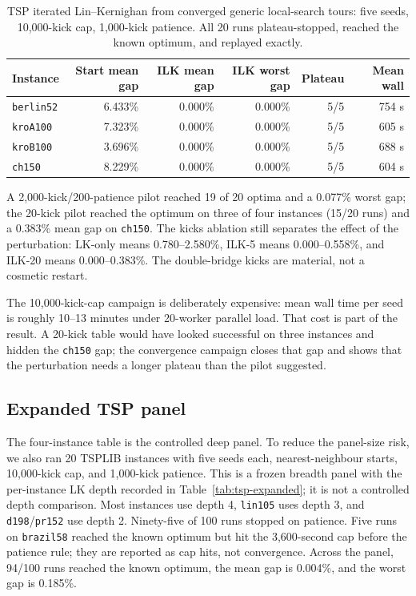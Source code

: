 \documentclass[11pt]{article}
\begin{document}
\begin{table}[t]
\centering
\caption{TSP iterated Lin--Kernighan from converged generic local-search tours: five seeds, 10,000-kick cap,
1,000-kick patience. All 20 runs plateau-stopped, reached the known optimum, and replayed exactly.}
\label{tab:tsp-ilk}
\small
\begin{tabular}{lrrrrr}
\toprule
Instance & Start mean gap & ILK mean gap & ILK worst gap & Plateau & Mean wall \\
\midrule
\texttt{berlin52} & 6.433\% & 0.000\% & 0.000\% & 5/5 & 754 s \\
\texttt{kroA100} & 7.323\% & 0.000\% & 0.000\% & 5/5 & 605 s \\
\texttt{kroB100} & 3.696\% & 0.000\% & 0.000\% & 5/5 & 688 s \\
\texttt{ch150} & 8.229\% & 0.000\% & 0.000\% & 5/5 & 604 s \\
\bottomrule
\end{tabular}
\end{table}

A 2,000-kick/200-patience pilot reached 19 of 20 optima and a 0.077\% worst gap; the 20-kick pilot
reached the optimum on three of four instances (15/20 runs) and a 0.383\% mean gap on \texttt{ch150}. The kicks ablation still separates the
effect of the perturbation: LK-only means 0.780--2.580\%, ILK-5 means 0.000--0.558\%, and ILK-20 means
0.000--0.383\%. The double-bridge kicks are material, not a cosmetic restart.

The 10,000-kick-cap campaign is deliberately expensive: mean wall time per seed is roughly 10--13 minutes
under 20-worker parallel load. That cost is part of the result. A 20-kick table would have looked
successful on three instances and hidden the \texttt{ch150} gap; the convergence campaign closes that
gap and shows that the perturbation needs a longer plateau than the pilot suggested.

\subsection{Expanded TSP panel}

The four-instance table is the controlled deep panel. To reduce the panel-size risk, we also ran 20
TSPLIB instances with five seeds each, nearest-neighbour starts, 10,000-kick cap, and 1,000-kick
patience. This is a frozen breadth panel with the per-instance LK depth recorded in Table~\ref{tab:tsp-expanded}; it is not a controlled depth comparison. Most instances use depth 4, \texttt{lin105} uses depth 3, and \texttt{d198}/\texttt{pr152} use depth 2. Ninety-five of 100 runs stopped on patience. Five runs on
\texttt{brazil58} reached the known optimum but hit the 3,600-second cap before the patience rule;
they are reported as cap hits, not convergence. Across the panel, 94/100 runs reached the known
optimum, the mean gap is 0.004\%, and the worst gap is 0.185\%.
\end{document}
